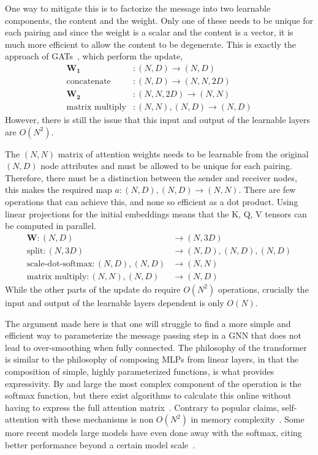 One way to mitigate this is to factorize the message into two learnable components, the content and the weight.
Only one of these needs to be unique for each pairing and since the weight is a scalar and the content is a vector, it is much more efficient to allow the content to be degenerate.
This is exactly the approach of GATs~, which perform the update,
\begin{align}
    \mathbf{W_1}&: (N, D)  \rightarrow (N, D) \\
    \text{concatenate}&: (N, D)  \rightarrow (N, N, 2D) \\
    \mathbf{W_2}&: (N, N, 2D)  \rightarrow (N, N) \\
    \text{matrix multiply}&: (N, N), (N, D)  \rightarrow (N, D)
\end{align}
However, there is still the issue that this input and output of the learnable layers are $O(N^2)$.

The $(N, N)$ matrix of attention weights needs to be learnable from the original $(N, D)$ node attributes and must be allowed to be unique for each pairing.
Therefore, there must be a distinction between the sender and receiver nodes, this makes the required map $a: (N, D), (N, D) \rightarrow (N, N)$.
There are few operations that can achieve this, and none so efficient as a dot product.
Using linear projections for the initial embeddings means that the K, Q, V tensors can be computed in parallel.
\begin{align}
    \mathbf{W}: (N, D) & \rightarrow (N, 3D) \\
    \text{split}: (N, 3D) & \rightarrow (N, D), (N, D), (N, D) \\
    \text{scale-dot-softmax}: (N, D), (N, D) & \rightarrow (N, N) \\
    \text{matrix multiply}: (N, N), (N, D) & \rightarrow (N, D)
\end{align}
While the other parts of the update do require $O(N^2)$ operations, crucially the input and output of the learnable layers dependent is only $O(N)$.

The argument made here is that one will struggle to find a more simple and efficient way to parameterize the message passing step in a GNN that does not lead to over-smoothing when fully connected.
The philosophy of the transformer is similar to the philosophy of composing MLPs from linear layers, in that the composition of simple, highly parameterized functions, is what provides expressivity.
By and large the most complex component of the operation is the softmax function, but there exist algorithms to calculate this online without having to express the full attention matrix~.
Contrary to popular claims, self-attention with these mechanisms is non $O(N^2)$ in memory complexity~.
Some more recent models large models have even done away with the softmax, citing better performance beyond a certain model scale~.

